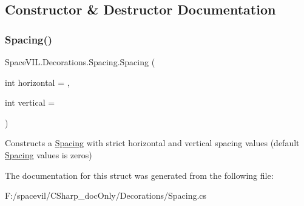 \subsection{Constructor \& Destructor Documentation}
\mbox{\label{struct_space_v_i_l_1_1_decorations_1_1_spacing_aef752609b39f6b9c34545edff478fbb6}} 
\subsubsection{\texorpdfstring{Spacing()}{Spacing()}}
{\footnotesize\ttfamily Space\+V\+I\+L.\+Decorations.\+Spacing.\+Spacing (\begin{DoxyParamCaption}\item[{int}]{horizontal = {},  }\item[{int}]{vertical = {} }\end{DoxyParamCaption})}



Constructs a \mbox{\hyperlink{struct_space_v_i_l_1_1_decorations_1_1_spacing}{Spacing}} with strict horizontal and vertical spacing values (default \mbox{\hyperlink{struct_space_v_i_l_1_1_decorations_1_1_spacing}{Spacing}} values is zeros) 



The documentation for this struct was generated from the following file\+:\begin{DoxyCompactItemize}
\item 
F\+:/spacevil/\+C\+Sharp\+\_\+doc\+Only/\+Decorations/Spacing.\+cs\end{DoxyCompactItemize}
